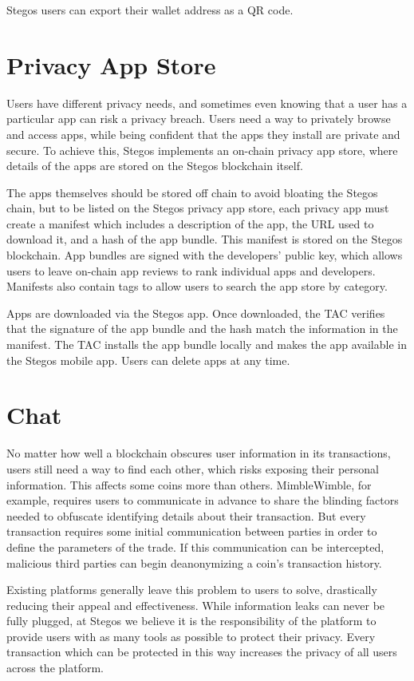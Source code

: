 \documentclass[8pt,fleqn,openany]{book}
\begin{document}
	Stegos users can export their wallet address as a QR code.
	
	\section{Privacy App Store}\label{sec:appstore}
	Users have different privacy needs, and sometimes even knowing that a user has a particular app can risk a privacy breach. Users need a way to privately browse and access apps, while being confident that the apps they install are private and secure. To achieve this, Stegos implements an on-chain privacy app store, where details of the apps are stored on the Stegos blockchain itself.
	
	The apps themselves should be stored off chain to avoid bloating the Stegos chain, but to be listed on the Stegos privacy app store, each privacy app must create a manifest which includes a description of the app, the URL used to download it, and a hash of the app bundle. This manifest is stored on the Stegos blockchain. App bundles are signed with the developers' public key, which allows users to leave on-chain app reviews to rank individual apps and developers. Manifests also contain tags to allow users to search the app store by category.
	
	Apps are downloaded via the Stegos app. Once downloaded, the TAC verifies that the signature of the app bundle and the hash match the information in the manifest. The TAC installs the app bundle locally and makes the app available in the Stegos mobile app. Users can delete apps at any time.
	
	\section{Chat}\label{sec:chat}
	No matter how well a blockchain obscures user information in its transactions, users still need a way to find each other, which risks exposing their personal information. This affects some coins more than others. MimbleWimble, for example, requires users to communicate in advance to share the blinding factors needed to obfuscate identifying details about their transaction. But every transaction requires some initial communication between parties in order to define the parameters of the trade. If this communication can be intercepted, malicious third parties can begin deanonymizing a coin’s transaction history. 
	
	Existing platforms generally leave this problem to users to solve, drastically reducing their appeal and effectiveness. While information leaks can never be fully plugged, at Stegos we believe it is the responsibility of the platform to provide users with as many tools as possible to protect their privacy. Every transaction which can be protected in this way increases the privacy of all users across the platform.
	
\end{document}
